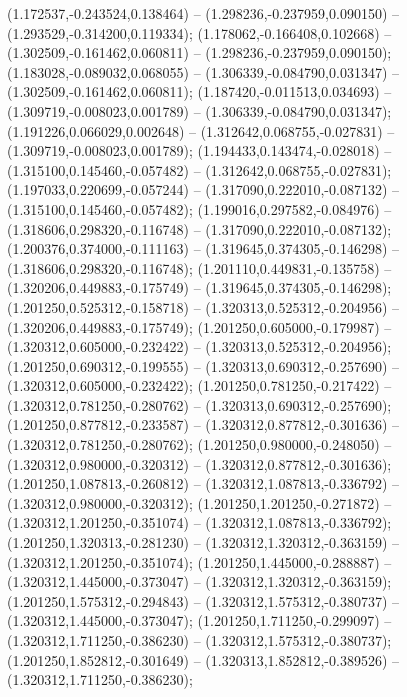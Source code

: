  (1.172537,-0.243524,0.138464) -- (1.298236,-0.237959,0.090150) -- (1.293529,-0.314200,0.119334);
 (1.178062,-0.166408,0.102668) -- (1.302509,-0.161462,0.060811) -- (1.298236,-0.237959,0.090150);
 (1.183028,-0.089032,0.068055) -- (1.306339,-0.084790,0.031347) -- (1.302509,-0.161462,0.060811);
 (1.187420,-0.011513,0.034693) -- (1.309719,-0.008023,0.001789) -- (1.306339,-0.084790,0.031347);
 (1.191226,0.066029,0.002648) -- (1.312642,0.068755,-0.027831) -- (1.309719,-0.008023,0.001789);
 (1.194433,0.143474,-0.028018) -- (1.315100,0.145460,-0.057482) -- (1.312642,0.068755,-0.027831);
 (1.197033,0.220699,-0.057244) -- (1.317090,0.222010,-0.087132) -- (1.315100,0.145460,-0.057482);
 (1.199016,0.297582,-0.084976) -- (1.318606,0.298320,-0.116748) -- (1.317090,0.222010,-0.087132);
 (1.200376,0.374000,-0.111163) -- (1.319645,0.374305,-0.146298) -- (1.318606,0.298320,-0.116748);
 (1.201110,0.449831,-0.135758) -- (1.320206,0.449883,-0.175749) -- (1.319645,0.374305,-0.146298);
 (1.201250,0.525312,-0.158718) -- (1.320313,0.525312,-0.204956) -- (1.320206,0.449883,-0.175749);
 (1.201250,0.605000,-0.179987) -- (1.320312,0.605000,-0.232422) -- (1.320313,0.525312,-0.204956);
 (1.201250,0.690312,-0.199555) -- (1.320313,0.690312,-0.257690) -- (1.320312,0.605000,-0.232422);
 (1.201250,0.781250,-0.217422) -- (1.320312,0.781250,-0.280762) -- (1.320313,0.690312,-0.257690);
 (1.201250,0.877812,-0.233587) -- (1.320312,0.877812,-0.301636) -- (1.320312,0.781250,-0.280762);
 (1.201250,0.980000,-0.248050) -- (1.320312,0.980000,-0.320312) -- (1.320312,0.877812,-0.301636);
 (1.201250,1.087813,-0.260812) -- (1.320312,1.087813,-0.336792) -- (1.320312,0.980000,-0.320312);
 (1.201250,1.201250,-0.271872) -- (1.320312,1.201250,-0.351074) -- (1.320312,1.087813,-0.336792);
 (1.201250,1.320313,-0.281230) -- (1.320312,1.320312,-0.363159) -- (1.320312,1.201250,-0.351074);
 (1.201250,1.445000,-0.288887) -- (1.320312,1.445000,-0.373047) -- (1.320312,1.320312,-0.363159);
 (1.201250,1.575312,-0.294843) -- (1.320312,1.575312,-0.380737) -- (1.320312,1.445000,-0.373047);
 (1.201250,1.711250,-0.299097) -- (1.320312,1.711250,-0.386230) -- (1.320312,1.575312,-0.380737);
 (1.201250,1.852812,-0.301649) -- (1.320313,1.852812,-0.389526) -- (1.320312,1.711250,-0.386230);
